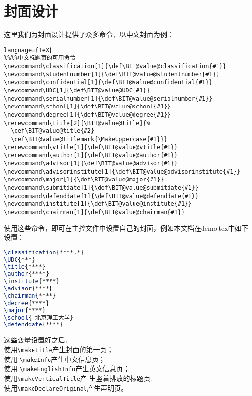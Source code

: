 \section{封面设计}
这里我们为封面设计提供了众多命令，以中文封面为例：
\begin{lstlisting}language={TeX}
%%%%中文标题页的可用命令
\newcommand\classification[1]{\def\BIT@value@classification{#1}}
\newcommand\studentnumber[1]{\def\BIT@value@studentnumber{#1}}
\newcommand\confidential[1]{\def\BIT@value@confidential{#1}}
\newcommand\UDC[1]{\def\BIT@value@UDC{#1}}
\newcommand\serialnumber[1]{\def\BIT@value@serialnumber{#1}}
\newcommand\school[1]{\def\BIT@value@school{#1}}
\newcommand\degree[1]{\def\BIT@value@degree{#1}}
\renewcommand\title[2][\BIT@value@title]{%
  \def\BIT@value@title{#2}
  \def\BIT@value@titlemark{\MakeUppercase{#1}}}
\renewcommand\vtitle[1]{\def\BIT@value@vtitle{#1}}
\renewcommand\author[1]{\def\BIT@value@author{#1}}
\newcommand\advisor[1]{\def\BIT@value@advisor{#1}}
\newcommand\advisorinstitute[1]{\def\BIT@value@advisorinstitute{#1}}
\newcommand\major[1]{\def\BIT@value@major{#1}}
\newcommand\submitdate[1]{\def\BIT@value@submitdate{#1}}
\newcommand\defenddate[1]{\def\BIT@value@defenddate{#1}}
\newcommand\institute[1]{\def\BIT@value@institute{#1}}
\newcommand\chairman[1]{\def\BIT@value@chairman{#1}}

\end{lstlisting}

使用这些命令，即可在主控文件中设置自己的封面，例如本文档在demo.tex中如下
设置：
\begin{lstlisting}[language={TeX}]
\classification{****.*}
\UDC{***}
\title{****}
\author{****}
\institute{****}
\advisor{****}
\chairman{****}
\degree{****}
\major{****}
\school{ 北京理工大学}
\defenddate{****}
\end{lstlisting}

这些变量设置好之后，\\使用\verb+\maketitle+产生封面的第一页；\\使用
\verb+\makeInfo+产生中文信息页；\\使用
\verb+\makeEnglishInfo+产生英文信息页；\\使用\verb+\makeVerticalTitle+产
生竖着排放的标题页;\\使用\verb+\makeDeclareOriginal+产生声明页。
